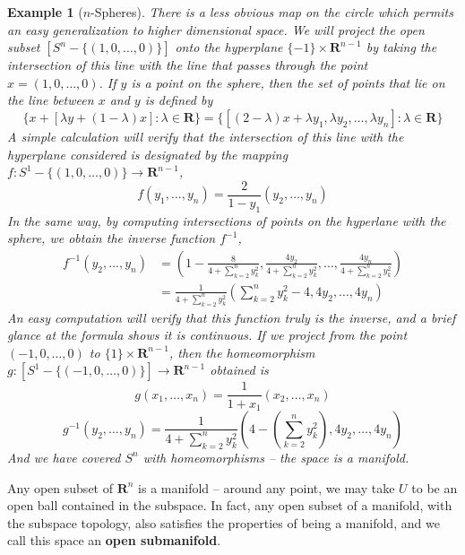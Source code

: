 \documentclass[12pt]{report}
\theoremstyle{plain}
\newtheorem*{example}{Example}
\theoremstyle{definition}
\begin{document}
\begin{example}[$n$-Spheres]
    There is a less obvious map on the circle which permits an easy generalization to higher dimensional space. We will project the open subset $[S^n - \{(1,0,\dots,0)\}]$ onto the hyperplane $\{-1\} \times \mathbf{R}^{n-1}$ by taking the intersection of this line with the line that passes through the point $x = (1,0, \dots, 0)$. If $y$ is a point on the sphere, then the set of points that lie on the line between $x$ and $y$ is defined by
    \[ \{ x + [\lambda y + (1 - \lambda) x] : \lambda \in \mathbf{R} \} = \{ [(2 - \lambda)x + \lambda y_1, \lambda y_2, \dots, \lambda y_n] : \lambda \in \mathbf{R} \} \]
    A simple calculation will verify that the intersection of this line with the hyperplane considered is designated by the mapping $f: S^1 - \{ (1,0,\dots,0) \} \to \mathbf{R}^{n-1}$,
    \[ f(y_1, \dots, y_n) = \frac{2}{1 - y_1}(y_2, \dots, y_n) \]
    In the same way, by computing intersections of points on the hyperlane with the sphere, we obtain the inverse function $f^{-1}$,
    \begin{align*}
        f^{-1}(y_2, \dots, y_n) &= \left(1 - \frac{8}{4 + \sum_{k = 2}^n y_k^2}, \frac{4y_2}{4 + \sum_{k = 2}^n y_k^2}, \dots, \frac{4y_n}{4 + \sum_{k = 2}^n y_k^2} \right)\\
        &= \frac{1}{4 + \sum_{k = 2}^n y_k^2} \left( \sum_{k = 2}^n y_k^2 - 4, 4y_2, \dots, 4y_n \right)
    \end{align*}
    An easy computation will verify that this function truly is the inverse, and a brief glance at the formula shows it is continuous. If we project from the point $(-1,0,\dots,0)$ to $\{ 1 \} \times \mathbf{R}^{n-1}$, then the homeomorphism $g:[S^1 - \{ (-1, 0, \dots, 0) \}] \to \mathbf{R}^{n-1}$ obtained is
    \[ g(x_1, \dots, x_n) = \frac{1}{1 + x_1}(x_2, \dots, x_n) \]
    \[ g^{-1}(y_2, \dots, y_n) = \frac{1}{4 + \sum_{k = 2}^n y_k^2} \left( 4 - \left(\sum_{k = 2}^n y_k^2 \right), 4y_2, \dots, 4y_n \right) \]
    And we have covered $S^n$ with homeomorphisms -- the space is a manifold.
\end{example}

Any open subset of $\mathbf{R}^n$ is a manifold -- around any point, we may take $U$ to be an open ball contained in the subspace. In fact, any open subset of a manifold, with the subspace topology, also satisfies the properties of being a manifold, and we call this space an {\bf open submanifold}.
\end{document}
